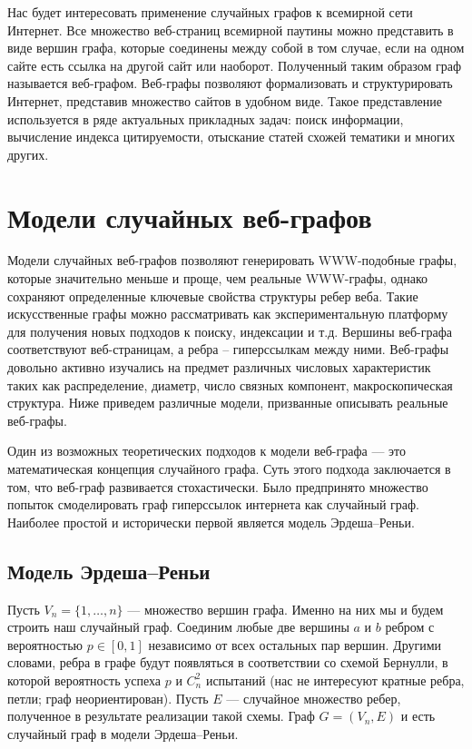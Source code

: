 \documentclass[14pt]{extreport}
\begin{document}
Нас будет интересовать применение случайных графов к всемирной сети Интернет. Все множество веб-страниц всемирной паутины можно представить в виде вершин графа, которые соединены между собой в том случае, если на одном сайте есть ссылка на другой сайт или наоборот. Полученный таким образом граф называется веб-графом. 
Веб-графы позволяют формализовать и структурировать Интернет, представив множество сайтов в удобном виде. Такое представление используется в ряде актуальных прикладных задач: поиск информации, вычисление индекса цитируемости, отыскание статей схожей тематики и многих других.

\chapter{Модели случайных веб-графов}

Модели случайных веб-графов\cite{book1} позволяют генерировать WWW-подоб\-ные графы, которые значительно меньше и проще, чем реальные WWW-графы, однако сохраняют определенные ключевые свойства структуры ребер веба. Такие искусственные графы можно рассматривать как экспериментальную платформу для получения новых подходов к поиску, индексации и т.д.
Вершины веб-графа соответствуют веб-страницам, а ребра – гиперссылкам между ними. Веб-графы довольно активно изучались на предмет различных числовых характеристик таких как распределение, диаметр, число связных компонент, макроскопическая структура. Ниже приведем различные модели, призванные описывать реальные веб-графы.

Один из возможных теоретических подходов к модели веб-графа --- это математическая концепция случайного графа. Суть этого подхода заключается в том, что веб-граф развивается стохастически.
Было предпринято множество попыток смоделировать граф гиперссылок интернета как случайный граф. Наиболее простой и исторически первой является модель Эрдеша--Реньи.

\section{Модель Эрдеша--Реньи}  

Пусть $V_n = \{1,\dots,n\}$ --- множество вершин графа. Именно на них мы и будем строить наш случайный граф. Соединим любые две вершины $a$ и $b$ ребром с вероятностью $p \in [0, 1]$ независимо от всех остальных пар вершин. Другими словами, ребра в графе будут появляться в соответствии со схемой Бернулли, в которой вероятность успеха $p$ и $C_n^2$ испытаний (нас не интересуют кратные ребра, петли; граф неориентирован). Пусть $E$ --- случайное множество ребер, полученное в результате реализации такой схемы. Граф $G = (V_n, E)$ и есть случайный граф в модели Эрдеша--Реньи.
\end{document}
